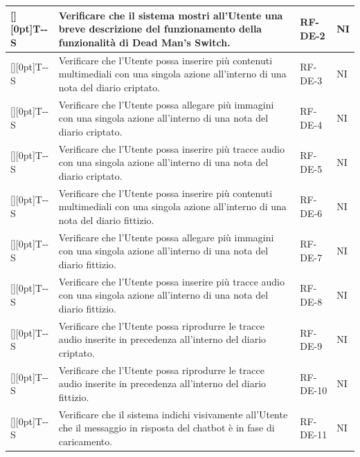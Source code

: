 \documentclass[a4paper,12pt]{article}
\newcounter{testsys}
\newcommand{\systestcode}{%
  \raisebox{0pt}[\height][0pt]{\hypertarget{T-\arabic{testsys}-S}{}}T-\arabic{testsys}-S%
}
\begin{document}
\begin{longtable}{| >{\centering\arraybackslash}p{} | >{\raggedright\arraybackslash}p{} | >{\centering\arraybackslash}p{} | >{\centering\arraybackslash}p{} |}
\stepcounter{testsys} \systestcode & Verificare che il sistema mostri all'Utente una breve descrizione del funzionamento della funzionalità di Dead Man's Switch. & RF-DE-2 & NI \\
\hline

\stepcounter{testsys} \systestcode & Verificare che l'Utente possa inserire più contenuti multimediali con una singola azione all'interno di una nota del diario criptato. & RF-DE-3 & NI \\
\hline

\stepcounter{testsys} \systestcode & Verificare che l'Utente possa allegare più immagini con una singola azione all'interno di una nota del diario criptato. & RF-DE-4 & NI \\
\hline

\stepcounter{testsys} \systestcode & Verificare che l'Utente possa inserire più tracce audio con una singola azione all'interno di una nota del diario criptato. & RF-DE-5 & NI \\
\hline

\stepcounter{testsys} \systestcode & Verificare che l'Utente possa inserire più contenuti multimediali con una singola azione all'interno di una nota del diario fittizio. & RF-DE-6 & NI \\
\hline

\stepcounter{testsys} \systestcode & Verificare che l'Utente possa allegare più immagini con una singola azione all'interno di una nota del diario fittizio. & RF-DE-7 & NI \\
\hline

\stepcounter{testsys} \systestcode & Verificare che l'Utente possa inserire più tracce audio con una singola azione all'interno di una nota del diario fittizio. & RF-DE-8 & NI \\
\hline

\stepcounter{testsys} \systestcode & Verificare che l'Utente possa riprodurre le tracce audio inserite in precedenza all'interno del diario criptato. & RF-DE-9 & NI \\
\hline

\stepcounter{testsys} \systestcode & Verificare che l'Utente possa riprodurre le tracce audio inserite in precedenza all'interno del diario fittizio. & RF-DE-10 & NI \\
\hline

\stepcounter{testsys} \systestcode & Verificare che il sistema indichi visivamente all'Utente che il messaggio in risposta del chatbot è in fase di caricamento. & RF-DE-11 & NI \\
\hline


\end{longtable}
\end{document}
